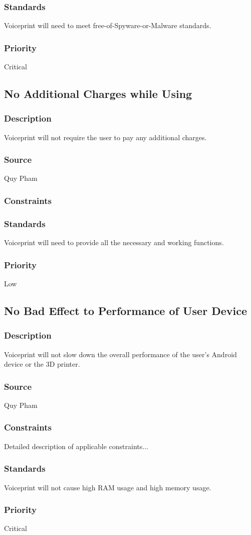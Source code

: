 \subsubsection{Standards}
Voiceprint will need to meet free-of-Spyware-or-Malware standards.
\subsubsection{Priority}
Critical

\subsection{No Additional Charges while Using}
\subsubsection{Description}
Voiceprint will not require the user to pay any additional charges.
\subsubsection{Source}
Quy Pham
\subsubsection{Constraints}

\subsubsection{Standards}
Voiceprint will need to provide all the necessary and working functions.
\subsubsection{Priority}
Low

\subsection{No Bad Effect to Performance of User Device}
\subsubsection{Description}
Voiceprint will not slow down the overall performance of the user's Android device or the 3D printer.
\subsubsection{Source}
Quy Pham
\subsubsection{Constraints}
Detailed description of applicable constraints...
\subsubsection{Standards}
Voiceprint will not cause high RAM usage and high memory usage.
\subsubsection{Priority}
Critical